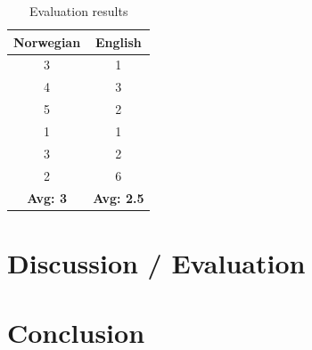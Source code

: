 \documentclass{article}
\begin{document}
\begin{table}[hbt!]
    \centering
    \begin{tabular}{|c|c|}
        \hline
        \textbf{Norwegian} & \textbf{English}\\
        \hline
        3 & 1\\
        4 & 3\\
        5 & 2\\
        1 & 1\\
        3 & 2\\
        2 & 6\\
        \hline
        \textbf{Avg: 3} & \textbf{Avg: 2.5}\\
        \hline
    \end{tabular}
    \caption{Evaluation results}
    \label{tab:evaluation-results}
\end{table}

\section*{Discussion / Evaluation}




\section*{Conclusion}



\printbibliography
\end{document}
